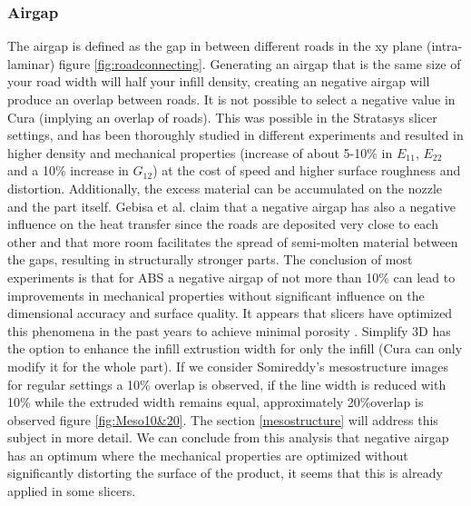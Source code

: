 \subsubsection{Airgap}
The airgap is defined as the gap in between different roads in the xy plane (intra-laminar) figure \ref{fig:roadconnecting}. Generating an airgap that is the same size of your road width will half your infill density, creating an negative airgap will produce an overlap between roads. It is not possible to select a negative value in Cura (implying an overlap of roads). This was possible in the Stratasys slicer settings, and has been thoroughly studied in different experiments \cite{Somireddy2017MechanicalMesostructure}  \cite{Rodriguez2001MechanicalInvestigation}   \cite{Ahn2002AnisotropicABS}  \cite{Dawoud2016MechanicalTechniques} \cite{Gebisa2018InvestigatingExperiment}
\cite{HossainImprovingParameters}
and resulted in higher density and mechanical properties (increase of about 5-10\% in $E_{11}$, $E_{22}$ and a 10\% increase in $G_{12}$) at the cost of speed and higher surface roughness and distortion. Additionally, the excess material can be accumulated on the nozzle and the part itself. Gebisa et al. \cite{Gebisa2018InvestigatingExperiment} claim that a negative airgap has also a negative influence on the heat transfer since the roads are deposited very close to each other and that more room facilitates the spread of semi-molten material between the gaps, resulting in structurally stronger parts. The conclusion of most experiments is that for ABS a negative airgap of not more than 10\% can lead to improvements in mechanical properties without significant influence on the dimensional accuracy and surface quality. It appears that  slicers have optimized this phenomena in the past years to achieve minimal porosity \cite{GaryHodgsonSlic3rMath}. Simplify 3D has the option to enhance the infill extrustion width for only the infill (Cura can only modify it for the whole part).
If we consider Somireddy's \cite{Somireddy2017MechanicalMesostructure} mesostructure images for regular settings a 10\% overlap is observed,  if the line width is reduced with 10\% while the extruded width remains equal,  approximately 20\%overlap is observed figure \ref{fig:Meso10&20}. The section \ref{mesostructure} will address this subject in more detail.
We can conclude from this analysis that negative airgap has an optimum where the mechanical properties are optimized without significantly distorting the surface of the product, it seems that this is already applied in some slicers. 


